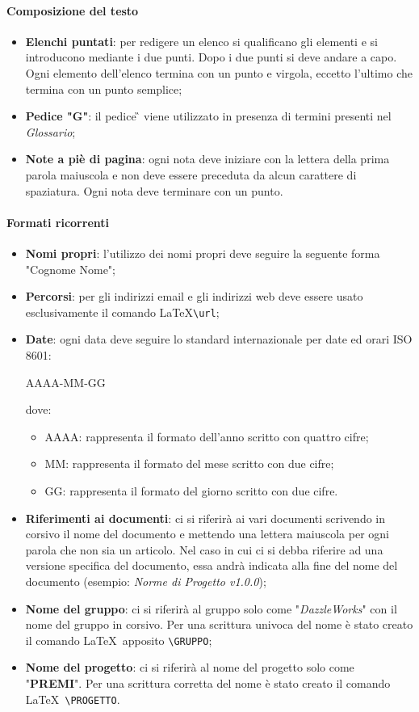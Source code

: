 \paragraph{Composizione del testo}
\begin{itemize}
	\item \textbf{Elenchi puntati}: per redigere un elenco si qualificano gli elementi e si introducono mediante
	i due punti. Dopo i due punti si deve andare a capo. Ogni elemento dell'elenco termina con un punto e virgola, eccetto l'ultimo che termina con un punto semplice;
	\item \textbf{Pedice "G"}: il pedice \G{} viene utilizzato in presenza di termini presenti nel \textit{Glossario};
	\item \textbf{Note a piè di pagina}: ogni nota deve iniziare con la lettera della prima parola maiuscola e non deve essere preceduta da alcun carattere di spaziatura. Ogni nota deve terminare con un punto.
\end{itemize}

\paragraph{Formati ricorrenti}
\begin{itemize}
	\item \textbf{Nomi propri}: l'utilizzo dei nomi propri deve seguire la seguente forma "Cognome Nome";
	\item \textbf{Percorsi}: per gli indirizzi email e gli indirizzi web deve essere usato esclusivamente il comando \LaTeX  \verb|\url|;
	\item \textbf{Date}:  ogni data deve seguire lo standard internazionale per date ed orari ISO 8601:
	\begin{center}
		AAAA-MM-GG
	\end{center}
	dove:
	\begin{itemize}
		\item AAAA: rappresenta il formato dell'anno scritto con quattro cifre;
		\item MM: rappresenta il formato del mese scritto con due cifre;
		\item GG: rappresenta il formato del giorno scritto con due cifre.
	\end{itemize}
	\item \textbf{Riferimenti ai documenti}: ci si riferirà ai vari documenti scrivendo in corsivo il nome del documento e mettendo una lettera maiuscola per ogni parola che non sia un articolo. Nel caso in cui ci si debba riferire ad una versione specifica del documento, essa andrà indicata alla fine  del nome del documento (esempio: \textit{Norme di Progetto v1.0.0});
	\item \textbf{Nome del gruppo}: ci si riferirà al gruppo solo come "\textit{DazzleWorks}" con il nome del gruppo in corsivo. Per una scrittura univoca del nome è stato creato il comando \LaTeX\ apposito \verb|\GRUPPO|;
	\item \textbf{Nome del progetto}: ci si riferirà al nome del progetto solo come "\textbf{PREMI}". Per una scrittura corretta del nome è stato creato il comando \LaTeX\ \verb|\PROGETTO|.
\end{itemize}

